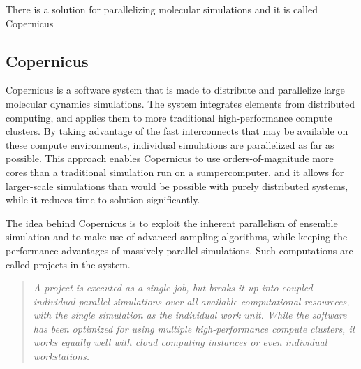 







There is a solution for parallelizing molecular simulations and it is
called Copernicus


\subsection{Copernicus}
Copernicus is a software system that is made to distribute and
parallelize large molecular dynamics simulations. The system
integrates elements from distributed computing, and applies them to
more traditional high-performance compute clusters. By taking
advantage of the fast interconnects that may be available on these
compute environments, individual simulations are parallelized as far
as possible. This approach enables Copernicus to use
orders-of-magnitude more cores than a traditional simulation run on a
sumpercomputer, and it allows for larger-scale simulations than would
be possible with purely distributed systems, while it reduces
time-to-solution significantly.

The idea behind Copernicus is to exploit the inherent parallelism of
ensemble simulation and to make use of advanced sampling algorithms,
while keeping the performance advantages of massively parallel
simulations. Such computations are called projects in the system.

\begin{quote} \slshape
  A project is executed as a single job, but breaks it up into coupled
  individual parallel simulations over all available computational
  resoureces, with the single simulation as the individual work
  unit. While the software has been optimized for using multiple
  high-performance compute clusters, it works equally well with cloud
  computing instances or even individual
  workstations.\citep{pronk:2011}
\end{quote}

